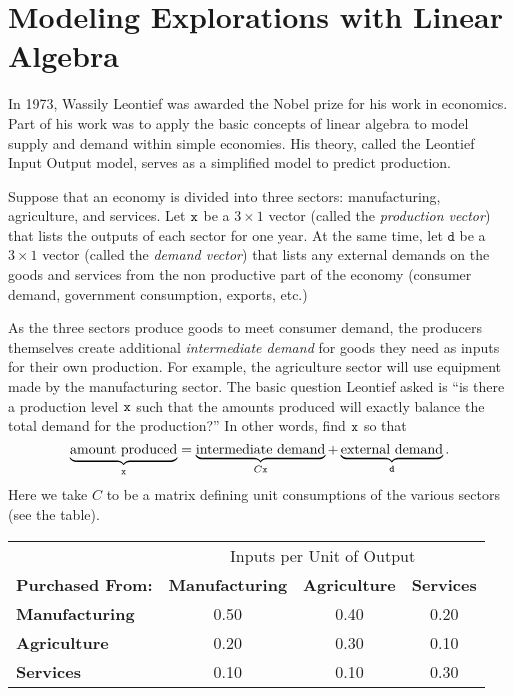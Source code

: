 \newpage\section{Modeling Explorations with Linear Algebra}
In 1973, Wassily Leontief was awarded the Nobel prize for his work in economics.  Part of
his work was to apply the basic concepts of linear algebra to model supply and demand
within simple economies.  His theory, called the Leontief Input Output model, serves as a
simplified model to predict production.

% 
\begin{lab}\label{PA:10.5}
    Suppose that an economy is divided into three sectors: manufacturing, agriculture, and
    services.  Let $\texttt{x}$ be a $3 \times 1$ vector (called the {\it production vector})
    that lists the outputs of each sector for one year.  At the same time, let $\texttt{d}$ be a
    $3 \times 1$ vector (called the {\it demand vector}) that lists any external demands
    on the goods and services from the non productive part of the economy (consumer
    demand, government consumption, exports, etc.)   

    As the three sectors produce goods to meet consumer demand, the producers themselves
    create additional {\it intermediate demand} for goods they need as inputs for their
    own production.  For example, the agriculture sector will use equipment made by the
    manufacturing sector. The basic question Leontief asked is ``is there a production
    level $\texttt{x}$ such that the amounts produced will exactly balance the total demand for
    the production?'' In other words, find $\texttt{x}$ so that
    \[ \underbrace{\text{amount produced}}_{\texttt{x}} = \underbrace{\text{intermediate
    demand}}_{C\texttt{x}} + \underbrace{\text{external demand}}_{\texttt{d}}. \]
    Here we take $C$ to be a matrix defining unit consumptions of the various sectors (see
    the table).

    \begin{center}
        \begin{tabular}{lccc}
            \hline
            & \multicolumn{3}{c}{Inputs per Unit of Output} \\ 
            {\bf Purchased From:} & {\bf Manufacturing} & {\bf Agriculture} & {\bf
            Services} \\ \hline \hline
            {\bf Manufacturing} &0.50  &0.40  &0.20  \\
            {\bf Agriculture} &0.20  &0.30  &0.10  \\
            {\bf Services} & 0.10 &0.10  &0.30  \\ \hline
        \end{tabular}
    \end{center}


\end{lab}
